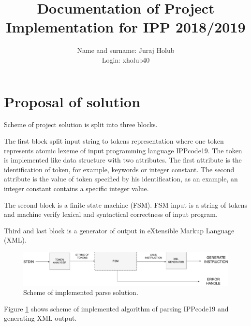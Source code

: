 \documentclass[a4paper, 10pt]{article}
\title{Documentation of Project Implementation for IPP 2018/2019 }
\author{Name and surname: Juraj Holub\\ Login: xholub40}
\date{}
\begin{document}
	\maketitle
	\thispagestyle{empty}

\section{Proposal of solution} \label{proposal}
Scheme of project solution is split into three blocks. 

The first block split input string to tokens representation where one token represents atomic lexeme of input programming language IPPcode19. The token is implemented like data structure with two attributes. The first attribute is the identification of token, for example, keywords or integer constant. The second attribute is the value of token specified by his identification, as an example, an integer constant contains a specific integer value.

The second block is a finite state machine (FSM). FSM input is a string of tokens and machine verify lexical and syntactical correctness of input program.

Third and last block is a generator of output in eXtensible Markup Language (XML). 

\begin{figure}[H] 
	\centering
	\includegraphics[width=.8 \paperwidth]{ipp_parse}
	\caption{Scheme of implemented parse solution.}
	\label{obr1}
\end{figure} 

Figure \ref{obr1} shows scheme of implemented algorithm of parsing IPPcode19 and generating XML output.
\end{document}
